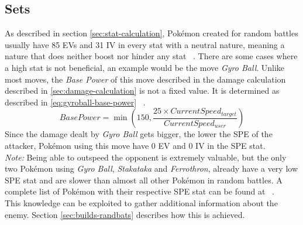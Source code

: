 \subsection{Sets}
\label{sec:randbats-sets}
As described in section \ref{sec:stat-calculation}, Pokémon created for random battles
usually have 85 \ac{EV}s and 31 \ac{IV} in every stat with a neutral nature, 
meaning a nature that does neither boost nor hinder any stat ~\autocite{Smogon:RandBatsGuide}.
There are some cases where a high stat is not beneficial, an example would be the 
move \textit{Gyro Ball}. Unlike most moves, the \textit{Base Power} of this move
described in the damage calculation described in \ref{sec:damage-calculation} is not
a fixed value. It is determined as described in \ref{eq:gyroball-base-power} ~\autocite{Bulbapedia:GyroBall}.
\begin{equation}
	\label{eq:gyroball-base-power}
	BasePower = \min\left( 150, \frac{25 \times CurrentSpeed_{target}}{CurrentSpeed_{user}}\right)
\end{equation} 
Since the damage dealt by \textit{Gyro Ball} gets bigger, the lower the \ac{SPE} of the
attacker, Pokémon using this move have 0 \ac{EV} and 0 \ac{IV} in the \ac{SPE} stat. \\
\textit{Note:} Being able to outspeed the opponent is extremely valuable, but the only
two Pokémon using \textit{Gyro Ball}, \textit{Stakataka} and \textit{Ferrothron}, already
have a very low \ac{SPE} stat and are slower than almost all other Pokémon in random
battles. A complete list of Pokémon with their respective \ac{SPE} stat can be found
at ~\autocite{Bulbapedia:PokemonBySpeed}. \\
This knowledge can be exploited to gather additional information about the enemy. Section
\ref{sec:builds-randbats} describes how this is achieved.

